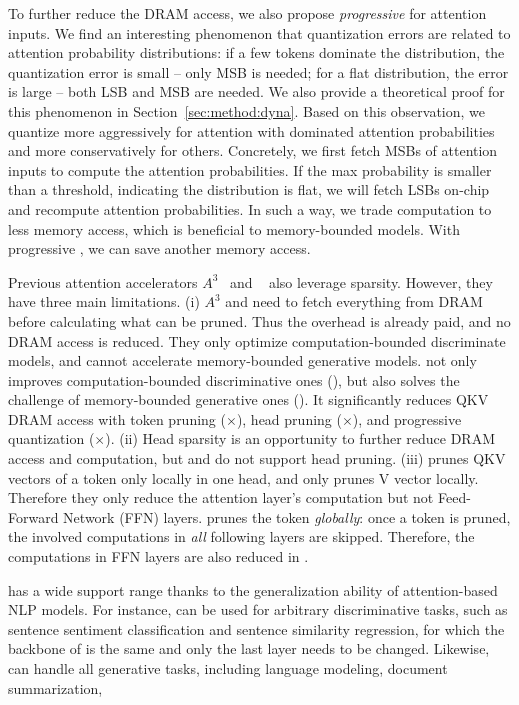To further reduce the DRAM access, we also propose \emph{progressive \lowprec} for attention inputs. We find an interesting phenomenon that quantization errors are related to attention probability distributions: if a few tokens dominate the distribution, the quantization error is small -- only MSB is needed; for a flat distribution, the error is large -- both LSB and MSB are needed. 
We also provide a theoretical proof for this phenomenon in Section~\ref{sec:method:dyna}. 
Based on this observation, we quantize more aggressively for attention with dominated attention probabilities and more conservatively for others. Concretely, we first fetch MSBs of attention inputs to compute the attention probabilities. If the max probability is smaller than a threshold, indicating the distribution is flat, we will fetch LSBs on-chip and recompute attention probabilities. 
In such a way, we trade computation to less memory access, which is beneficial to memory-bounded models. With progressive \lowprec, we can save another \dynadramsaving\x memory access.

Previous \sota attention accelerators $A^3$~\cite{ham20203} and \mnnfast~\cite{8980322} also leverage sparsity. However, they have three main limitations. 
(i) $A^3$ and \mnnfast need to fetch everything from DRAM before calculating what can be pruned. Thus the overhead is already paid, and no DRAM access is reduced. They only optimize computation-bounded discriminate models, and cannot accelerate memory-bounded generative models. \name not only improves computation-bounded discriminative ones (\bert), but also solves the challenge of memory-bounded generative ones (\gpttwo). It significantly reduces QKV DRAM access with token pruning (\prunegpttwodramsaving$\times$), head pruning (\hpdramsaving$\times$), and progressive quantization (\dynadramsaving$\times$). 
(ii) Head sparsity is an opportunity to further reduce DRAM access and computation, but \athree and \mnnfast do not support head pruning.
(iii) \athree prunes QKV vectors of a token only locally in one head, and \mnnfast only prunes V vector locally. Therefore they only reduce the attention layer's computation but not Feed-Forward Network (FFN) layers. \name prunes the token \emph{globally}: once a token is pruned, the involved computations in \emph{all} following layers are skipped. Therefore, the computations in FFN layers are also reduced in \name.

\name has a wide support range thanks to the generalization ability of attention-based NLP models. For instance, \bert can be used for arbitrary discriminative tasks, such as sentence sentiment classification and sentence similarity regression, for which the backbone of \bert is the same and only the last layer needs to be changed. Likewise, \gpttwo can handle all generative tasks, including language modeling, document summarization, \etc

